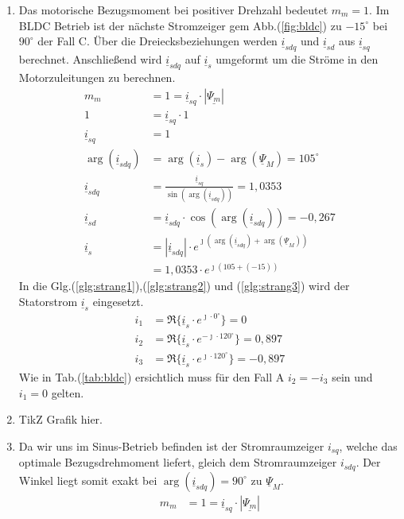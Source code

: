 \begin{solution}
\begin{enumerate}
\item Das motorische Bezugsmoment bei positiver Drehzahl bedeutet $m_m = 1$. Im BLDC Betrieb ist der n\"achste Stromzeiger gem Abb.(\ref{fig:bldc}) zu $-15^\circ$ bei $90^\circ$ der Fall C. \"Uber die Dreiecksbeziehungen werden $\underline{i}_{sdq}$ und $\underline{i}_{sd}$ aus $\underline{i}_{sq}$ berechnet. Anschließend wird $\underline{i}_{sdq}$ auf $\underline{i}_{s}$ umgeformt um die Str\"ome in den Motorzuleitungen zu berechnen.
\begin{align}
m_m &= 1 = \underline{i}_{sq} \cdot |\underline{\Psi_m}|\\
1 &= \underline{i}_{sq} \cdot 1\\
\underline{i}_{sq} &= 1\\
\arg(\underline{i}_{sdq}) &= \arg(\underline{i}_{s}) -\arg(\underline{\Psi}_{M})=105^\circ\\
\underline{i}_{sdq} &= \frac{\underline{i}_{sq}}{\sin(\arg(\underline{i}_{sdq}))}= 1,0353\\
\underline{i}_{sd} &= \underline{i}_{sdq} \cdot \cos(\arg(\underline{i}_{sdq})) = -0,267\\
\underline{i}_{s} &= |\underline{i}_{sdq}| \cdot e^{\jmath (\arg(\underline{i}_{sdq}) + \arg(\underline{\Psi}_{M}))}\\&= 1,0353 \cdot e^{\jmath ( 105 + (-15))}
\end{align}
In die Glg.(\ref{glg:strang1}),(\ref{glg:strang2}) und (\ref{glg:strang3}) wird der Statorstrom $\underline{i}_s$ eingesetzt.
\begin{align}
i_1 & = \Re \{ \underline{i}_s \cdot e^{\jmath \cdot 0 ^\circ} \} = 0\\
i_2 & = \Re \{ \underline{i}_s \cdot e^{-\jmath \cdot 120 ^\circ} \} = 0,897 \\
i_3 & = \Re \{ \underline{i}_s \cdot e^{\jmath \cdot 120 ^\circ} \}=  -0,897
\end{align}
Wie in Tab.(\ref{tab:bldc}) ersichtlich muss f\"ur den Fall A $i_2= -i_3$ sein und $i_1= 0$ gelten.
\item TikZ Grafik hier.
\item	Da wir uns im Sinus-Betrieb befinden ist der Stromraumzeiger $i_{sq}$, welche das optimale Bezugsdrehmoment liefert, gleich dem Stromraumzeiger $i_{sdq}$. Der Winkel liegt somit exakt bei $\arg(\underline{i}_{sdq})=90^\circ$ zu $\underline{\Psi}_M$.
\begin{align}
m_m &= 1 = \underline{i}_{sq} \cdot |\underline{\Psi_m}|\\

\end{align}
\end{enumerate}
\end{solution}
